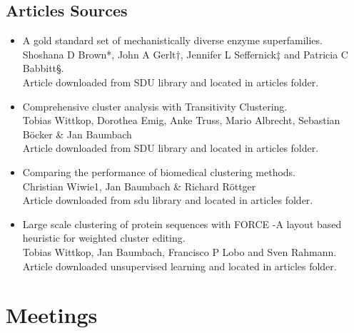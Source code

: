 \documentclass[a4paper,10pt]{article}
\begin{document}
\subsection{Articles Sources}
\begin{itemize}
	\item A gold standard set of mechanistically diverse enzyme superfamilies. \\ Shoshana D Brown*, John A Gerlt†, Jennifer L Seffernick‡ and
	Patricia C Babbitt§. \\
	Article downloaded from SDU library and located in articles folder.
	\item Comprehensive cluster analysis with Transitivity Clustering. \\
	Tobias Wittkop, Dorothea Emig, Anke Truss, Mario Albrecht, Sebastian Böcker \& Jan Baumbach \\
	Article downloaded from SDU library and located in articles folder.
	\item Comparing the performance of biomedical clustering
	methods. \\
	Christian Wiwie1, Jan Baumbach \& Richard Röttger \\
	Article downloaded from sdu library and located in articles folder.
	\item Large scale clustering of protein sequences with FORCE -A layout
	based heuristic for weighted cluster editing. \\
	Tobias Wittkop, Jan Baumbach, Francisco P Lobo and
	Sven Rahmann. \\
	Article downloaded unsupervised learning and located in articles folder.
\end{itemize}


\newpage
\section{Meetings}

\end{document}
